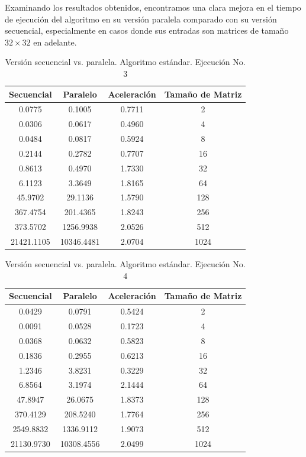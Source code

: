 \documentclass{article}
\begin{document}
Examinando los resultados obtenidos, encontramos una clara mejora en el tiempo de ejecución del algoritmo en su versión paralela comparado con su versión secuencial, especialmente en casos donde sus entradas son matrices de tamaño \(32 \times 32\) en adelante.\\

\clearpage

\begin{table}[ht]
\centering
\begin{tabular}{|c|c|c|c|}
\hline
\textbf{Secuencial} & \textbf{Paralelo} & \textbf{Aceleración} & \textbf{Tamaño de Matriz} \\
\hline
0.0775 & 0.1005 & 0.7711 & 2 \\
0.0306 & 0.0617 & 0.4960 & 4 \\
0.0484 & 0.0817 & 0.5924 & 8 \\
0.2144 & 0.2782 & 0.7707 & 16 \\
0.8613 & 0.4970 & 1.7330 & 32 \\
6.1123 & 3.3649 & 1.8165 & 64 \\
45.9702 & 29.1136 & 1.5790 & 128 \\
367.4754 & 201.4365 & 1.8243 & 256 \\
373.5702 & 1256.9938 & 2.0526 & 512 \\
21421.1105 & 10346.4481 & 2.0704 & 1024 \\
\hline
\end{tabular}
\caption{Versión secuencial vs. paralela. Algoritmo estándar. Ejecución No. 3}
\end{table}

\begin{table}[ht]
\centering
\begin{tabular}{|c|c|c|c|}
\hline
\textbf{Secuencial} & \textbf{Paralelo} & \textbf{Aceleración} & \textbf{Tamaño de Matriz} \\
\hline
0.0429 & 0.0791 & 0.5424 & 2 \\
0.0091 & 0.0528 & 0.1723 & 4 \\
0.0368 & 0.0632 & 0.5823 & 8 \\
0.1836 & 0.2955 & 0.6213 & 16 \\
1.2346 & 3.8231 & 0.3229 & 32 \\
6.8564 & 3.1974 & 2.1444 & 64 \\
47.8947 & 26.0675 & 1.8373 & 128 \\
370.4129 & 208.5240 & 1.7764 & 256 \\
2549.8832 & 1336.9112 & 1.9073 & 512 \\
21130.9730 & 10308.4556 & 2.0499 & 1024 \\
\hline
\end{tabular}
\caption{Versión secuencial vs. paralela. Algoritmo estándar. Ejecución No. 4}
\end{table}
\end{document}

